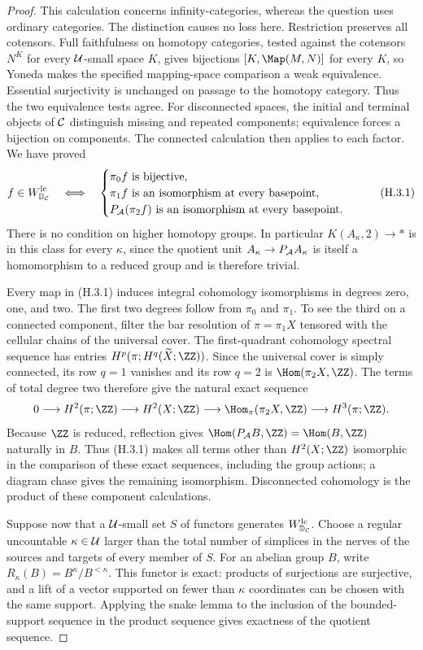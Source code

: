 \begin{proof}
This calculation concerns infinity-categories, whereas the question uses ordinary categories. The distinction causes no loss here. Restriction preserves all cotensors. Full faithfulness on homotopy categories, tested against the cotensors $N^K$ for every $\mathcal U$-small space $K$, gives bijections $[K,\Map(M,N)]$ for every $K$, so Yoneda makes the specified mapping-space comparison a weak equivalence. Essential surjectivity is unchanged on passage to the homotopy category. Thus the two equivalence tests agree. For disconnected spaces, the initial and terminal objects of $\mathcal C$ distinguish missing and repeated components; equivalence forces a bijection on components. The connected calculation then applies to each factor. We have proved
\[
 f\in W^{\mathrm{lc}}_{\mathbb D_{\mathcal C}}\quad\Longleftrightarrow\quad
 \begin{cases}
 \pi_0f\text{ is bijective},\\
 \pi_1f\text{ is an isomorphism at every basepoint},\\
 P_{\mathcal A}(\pi_2f)\text{ is an isomorphism at every basepoint}.
 \end{cases}                                                     \tag{H.3.1}
\]
There is no condition on higher homotopy groups. In particular $K(A_\kappa,2)\to*$ is in this class for every $\kappa$, since the quotient unit $A_\kappa\to P_{\mathcal A} A_\kappa$ is itself a homomorphism to a reduced group and is therefore trivial.

Every map in (H.3.1) induces integral cohomology isomorphisms in degrees zero, one, and two. The first two degrees follow from $\pi_0$ and $\pi_1$. To see the third on a connected component, filter the bar resolution of $\pi=\pi_1X$ tensored with the cellular chains of the universal cover. The first-quadrant cohomology spectral sequence has entries $H^p(\pi;H^q(\widetilde X;\ZZ))$. Since the universal cover is simply connected, its row $q=1$ vanishes and its row $q=2$ is $\Hom(\pi_2X,\ZZ)$. The terms of total degree two therefore give the natural exact sequence
\[
 0\longrightarrow H^2(\pi;\ZZ)\longrightarrow H^2(X;\ZZ)
 \longrightarrow\Hom_\pi(\pi_2X,\ZZ)
 \longrightarrow H^3(\pi;\ZZ).
\]
Because $\ZZ$ is reduced, reflection gives $\Hom(\PA B,\ZZ)=\Hom(B,\ZZ)$ naturally in $B$. Thus (H.3.1) makes all terms other than $H^2(X;\ZZ)$ isomorphic in the comparison of these exact sequences, including the group actions; a diagram chase gives the remaining isomorphism. Disconnected cohomology is the product of these component calculations.

Suppose now that a $\mathcal U$-small set $S$ of functors generates $W^{\mathrm{lc}}_{\mathbb D_{\mathcal C}}$. Choose a regular uncountable $\kappa\in\mathcal U$ larger than the total number of simplices in the nerves of the sources and targets of every member of $S$. For an abelian group $B$, write $R_\kappa(B)=B^\kappa/B^{<\kappa}$. This functor is exact: products of surjections are surjective, and a lift of a vector supported on fewer than $\kappa$ coordinates can be chosen with the same support. Applying the snake lemma to the inclusion of the bounded-support sequence in the product sequence gives exactness of the quotient sequence.


\end{proof}

